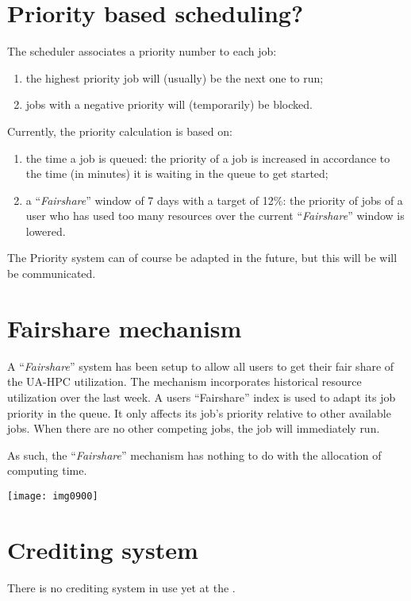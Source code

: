 \section{Priority based scheduling?}

The scheduler associates a priority number to each job:

\begin{enumerate}
\item  the highest priority job will (usually) be the next one to run;
\item  jobs with a negative priority will (temporarily) be blocked.
\end{enumerate}

Currently, the priority calculation is based on:

\begin{enumerate}
\item  the time a job is queued: the priority of a job is increased in accordance to the time (in minutes) it is waiting in the queue to get started;
\item  a ``\emph{Fairshare}'' window of 7 days with a target of 12\%: the priority of jobs of a user who has used too many resources over the current ``\emph{Fairshare}'' window is lowered.
\end{enumerate}

The Priority system can of course be adapted in the future, but this will be will be communicated.

\section{Fairshare mechanism}

A ``\emph{Fairshare}'' system has been setup to allow all users to get their
fair share of the UA-HPC utilization.  The mechanism incorporates historical
resource utilization over the last week.  A users ``Fairshare'' index is used
to adapt its job priority in the queue.  It only affects its job's priority
relative to other available jobs. When there are no other competing jobs, the
job will immediately run.

As such, the ``\emph{Fairshare}'' mechanism has nothing to do with the
allocation of computing time.

\texttt{[image: img0900]}

\section{Crediting system}

There is no crediting system in use yet at the \hpc.
